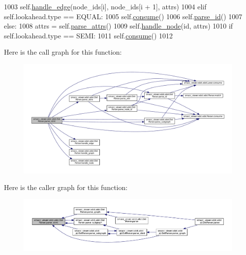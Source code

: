 \begin{DoxyCode}
1003                     self.\hyperlink{classsmacc__viewer_1_1xdot_1_1xdot_1_1DotParser_a1eb4713f9573be1383426eb7cc8b944d}{handle\_edge}(node\_ids[i], node\_ids[i + 1], attrs)
1004             \textcolor{keywordflow}{elif} self.lookahead.type == EQUAL:
1005                 self.\hyperlink{classsmacc__viewer_1_1xdot_1_1xdot_1_1Parser_ab70715898a2ec0b51c6b333b73c78c37}{consume}()
1006                 self.\hyperlink{classsmacc__viewer_1_1xdot_1_1xdot_1_1DotParser_aec7bb154831d9a665fbd1a6b609dc340}{parse\_id}()
1007             \textcolor{keywordflow}{else}:
1008                 attrs = self.\hyperlink{classsmacc__viewer_1_1xdot_1_1xdot_1_1DotParser_a4c4e5481923aea34020af094cea6a961}{parse\_attrs}()
1009                 self.\hyperlink{classsmacc__viewer_1_1xdot_1_1xdot_1_1DotParser_ac7bf39b9aad44e2aa5770441c5dbb399}{handle\_node}(id, attrs)
1010         \textcolor{keywordflow}{if} self.lookahead.type == SEMI:
1011             self.\hyperlink{classsmacc__viewer_1_1xdot_1_1xdot_1_1Parser_ab70715898a2ec0b51c6b333b73c78c37}{consume}()
1012 
\end{DoxyCode}


Here is the call graph for this function\+:
\nopagebreak
\begin{figure}[H]
\begin{center}
\leavevmode
\includegraphics[width=350pt]{classsmacc__viewer_1_1xdot_1_1xdot_1_1DotParser_ab0abf8209a36d81e162b0dc2a0b94d54_cgraph}
\end{center}
\end{figure}




Here is the caller graph for this function\+:
\nopagebreak
\begin{figure}[H]
\begin{center}
\leavevmode
\includegraphics[width=350pt]{classsmacc__viewer_1_1xdot_1_1xdot_1_1DotParser_ab0abf8209a36d81e162b0dc2a0b94d54_icgraph}
\end{center}
\end{figure}


